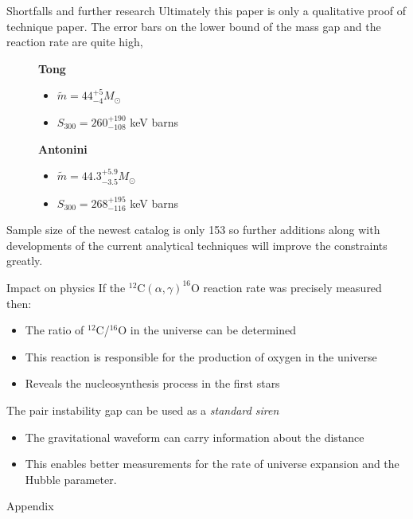 \documentclass[aspectratio=169]{beamer}
\begin{document}
\begin{frame}{Shortfalls and further research}
	Ultimately this paper is only a qualitative proof of technique paper. The error bars on the lower bound of the mass gap and the reaction rate are quite high, 
	\begin{figure}
		\textbf{Tong}
		\begin{itemize}
			\centering
			\item $\tilde{m} =  44_{-4}^{+5} M_{\odot}$ 
			\item $S_{300} = 260^{+190}_{-108}$ keV barns 
		\end{itemize}
		\textbf{Antonini}
		\begin{itemize}
			\centering
			\item $\tilde{m} = 44.3^{+5.9}_{-3.5} M_{\odot}$
			\item $S_{300} = 268^{+195}_{-116}$ keV barns 
		\end{itemize}
	\end{figure}
	Sample size of the newest catalog is only 153 so further additions  along with developments of the current analytical techniques will improve the constraints greatly.
\end{frame}

\begin{frame}{Impact on physics}
	If the $^{12}$C$(\alpha,\gamma)^{16}$O reaction rate was precisely measured then:
	\begin{itemize}
		\item The ratio of $^{12}$C/$^{16}$O in the universe can be determined
		\item This reaction is responsible for the production of oxygen in the universe
		\item Reveals the nucleosynthesis process in the first stars 
	\end{itemize}
	The pair instability gap can be used as a \textit{standard siren}
	\begin{itemize}
		\item The gravitational waveform can carry information about the distance
		\item This enables better measurements for the rate of universe expansion and the Hubble parameter.
	\end{itemize}
\end{frame}

\begin{frame}{Appendix}
\end{frame}
\end{document}
